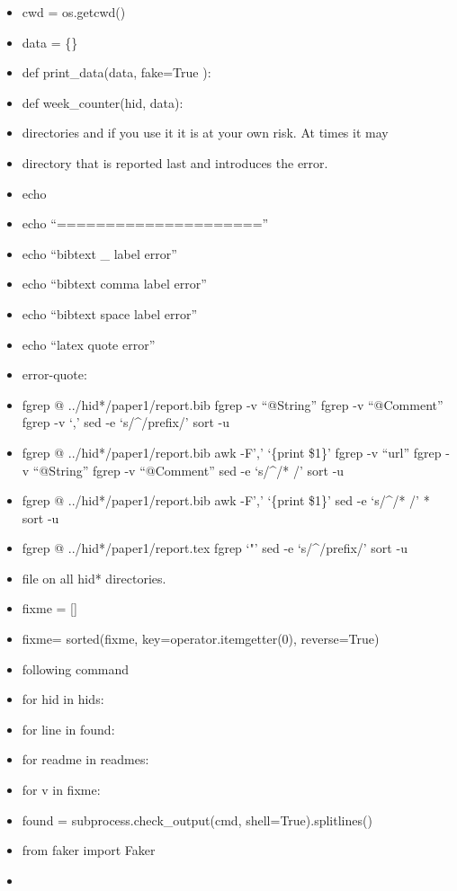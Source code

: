 \begin{itemize}
\item
  cwd = os.getcwd()
\item
  data = \{\}
\item
  def print\_data(data, fake=True ):
\item
  def week\_counter(hid, data):
\item
  directories and if you use it it is at your own risk. At times it may
\item
  directory that is reported last and introduces the error.
\item
  echo
\item
  echo ``=====================''
\item
  echo ``bibtext \_ label error''
\item
  echo ``bibtext comma label error''
\item
  echo ``bibtext space label error''
\item
  echo ``latex quote error''
\item
  error-quote:
\item
  fgrep @ ../hid*/paper1/report.bib \textbar{} fgrep -v ``@String''
  \textbar{} fgrep -v ``@Comment''\textbar{} fgrep -v `,' \textbar{} sed
  -e `s/\^{}/prefix/' \textbar{} sort -u
\item
  fgrep @ ../hid*/paper1/report.bib awk -F',' `\{print \$1\}' \textbar{}
  fgrep -v ``url'' \textbar{} fgrep -v ``@String'' \textbar{} fgrep -v
  ``@Comment''\textbar{} sed -e `s/\^{}/* /' \textbar{} sort -u
\item
  fgrep @ ../hid*/paper1/report.bib awk -F',' `\{print \$1\}' \textbar{}
  sed -e `s/\^{}/* /' * \textbar{} sort -u
\item
  fgrep @ ../hid*/paper1/report.tex \textbar{} fgrep `"' \textbar{} sed
  -e `s/\^{}/prefix/' \textbar{}sort -u
\item
  file on all hid* directories.
\item
  fixme = {[}{]}
\item
  fixme= sorted(fixme, key=operator.itemgetter(0), reverse=True)
\item
  following command
\item
  for hid in hids:
\item
  for line in found:
\item
  for readme in readmes:
\item
  for v in fixme:
\item
  found = subprocess.check\_output(cmd, shell=True).splitlines()
\item
  from faker import Faker
\item

\end{itemize}
